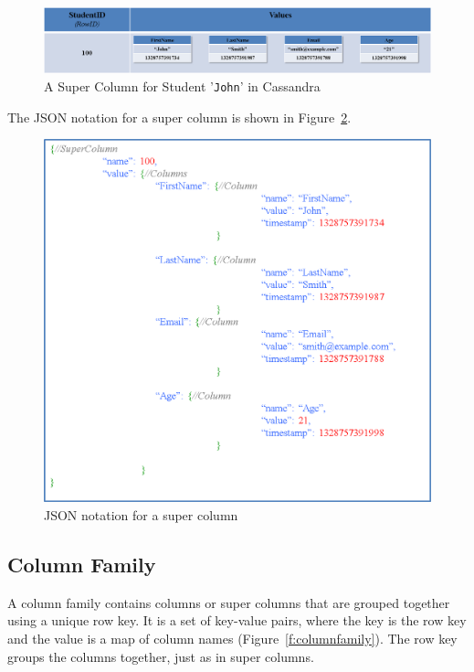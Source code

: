\begin{figure}[H]
	\centering
	\includegraphics[width=\textwidth]{./figure/Example/SuperColumn_John.png}
	\caption{A Super Column for Student '\texttt{John}' in
	Cassandra}\label{f:supercolumn-John}
\end{figure}

\newpage

The JSON notation for a super column is shown in Figure~\ref{f:supercolumn-JSON}. 


\begin{figure}[H]
	\centering
	\includegraphics[width=.9\textwidth]{./figure/Example/JSON_SuperColumn_John.png}
	\caption{JSON notation for a super column}\label{f:supercolumn-JSON}
\end{figure}


\subsection{Column Family}
 A column family contains columns or super columns that are
grouped together using a unique row key.  It is a set of key-value
pairs,   where the key is the row key and the value is a map of column names
(Figure~\ref{f:columnfamily}).  The row key groups the columns together,   just as
in super columns. 

